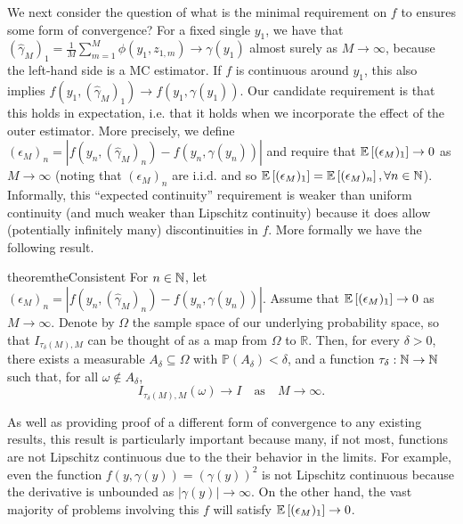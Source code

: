We next consider the question of what is the minimal requirement on $f$ to ensures some form of
convergence? For a fixed single $y_1$, we
have that $(\hat{\gamma}_M)_1=\frac{1}{M}\sum_{m=1}^{M} \phi(y_1,z_{1,m})\rightarrow\gamma(y_1)$ 
almost surely as $M \rightarrow \infty$, because the left-hand side is a MC estimator. If $f$ is continuous
around $y_1$, this also implies $f(y_1,(\hat{\gamma}_M)_1) \rightarrow
f(y_1,\gamma(y_1))$.  Our candidate requirement is that this holds in
expectation, i.e. that it holds when we incorporate the effect of the outer estimator.
More precisely, we define $(\epsilon_M)_n = \left|f(y_n, (\hat{\gamma}_M)_n) -
f(y_n,\gamma(y_n))\right|$ and require that $\mathbb{E}\left[(\epsilon_M)_1\right] \to 0$ as $M
\to \infty$ (noting that $(\epsilon_M)_n$ are i.i.d. and so
$\mathbb{E}\left[(\epsilon_M)_1\right] = \mathbb{E}\left[(\epsilon_M)_n\right], \forall n\in\mathbb{N}$). Informally, this ``expected continuity''
requirement is weaker than uniform continuity (and much weaker than Lipschitz continuity)
because it does allow (potentially infinitely
many) discontinuities in $f$.  More formally we have the following result.
\begin{restatable}{theorem}{theConsistent} \label{the:Consistent}
	For $n \in \mathbb{N}$, let $
	(\epsilon_M)_n = \left|f(y_n, (\hat{\gamma}_M)_n) - f(y_n, \gamma(y_n))\right|.$
  Assume that $\mathbb{E}\left[(\epsilon_M)_1\right] \to 0$  as $M \to \infty$. Denote by $\Omega$
  the sample space of our underlying probability space, so that $I_{\tau_\delta(M),M}$ can
  be thought of as a map from $\Omega$ to $\mathbb{R}$. Then, for every $\delta > 0$,
  there exists a measurable $A_\delta \subseteq \Omega$ with $\mathbb{P}(A_\delta) <
  \delta$, and a function $\tau_\delta : \mathbb{N} \to \mathbb{N}$ such that, for all $\omega\not\in
  A_\delta$,
	\[ 
		I_{\tau_\delta(M),M}(\omega) \to I\quad\mbox{as}\quad M \to \infty.
	\]
\end{restatable}
As well as providing proof of a different form of convergence to any existing results, this
result is particularly important because many, if not most, functions are not Lipschitz
continuous due to the their behavior in the limits.  For example, even the function $f(y,\gamma(y)) = \left(\gamma(y)\right)^2$
is not Lipschitz continuous because the derivative is unbounded as $\left|\gamma(y)\right|\rightarrow\infty$.
On the other hand, the vast majority of problems involving this $f$ will satisfy $\mathbb{E}\left[(\epsilon_M)_1\right] \to 0$.


